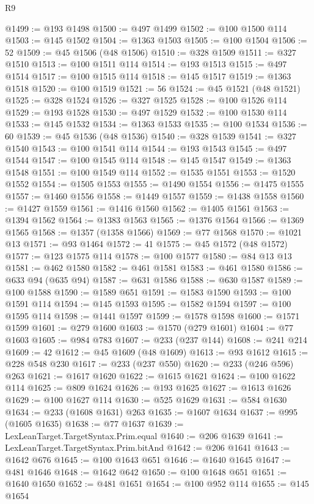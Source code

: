 \begin{lexlean}{R9}
\begin{coremodule}
{{{{{{{{{{{{{{{{{{{{{{{{{{{{{{{{{{{{{{{{{{{{{{{{{{{{{{{{{{{{{{{{{{{{{{{{{{{{{{{{{{{{{{{{{{{{{{{{{{{{{{{{{{{{@1499 := @193 @1498
@1500 := @497 @1499
@1502 := @100 @1500 @114
@1503 := @145 @1502
@1504 := @1363 @1503
@1505 := @100 @1504
@1506 := 52
@1509 := @45 @1506 (@48 @1506)
@1510 := @328 @1509
@1511 := @327 @1510
@1513 := @100 @1511 @114
@1514 := @193 @1513
@1515 := @497 @1514
@1517 := @100 @1515 @114
@1518 := @145 @1517
@1519 := @1363 @1518
@1520 := @100 @1519
@1521 := 56
@1524 := @45 @1521 (@48 @1521)
@1525 := @328 @1524
@1526 := @327 @1525
@1528 := @100 @1526 @114
@1529 := @193 @1528
@1530 := @497 @1529
@1532 := @100 @1530 @114
@1533 := @145 @1532
@1534 := @1363 @1533
@1535 := @100 @1534
@1536 := 60
@1539 := @45 @1536 (@48 @1536)
@1540 := @328 @1539
@1541 := @327 @1540
@1543 := @100 @1541 @114
@1544 := @193 @1543
@1545 := @497 @1544
@1547 := @100 @1545 @114
@1548 := @145 @1547
@1549 := @1363 @1548
@1551 := @100 @1549 @114
@1552 := @1535 @1551
@1553 := @1520 @1552
@1554 := @1505 @1553
@1555 := @1490 @1554
@1556 := @1475 @1555
@1557 := @1460 @1556
@1558 := @1449 @1557
@1559 := @1438 @1558
@1560 := @1427 @1559
@1561 := @1416 @1560
@1562 := @1405 @1561
@1563 := @1394 @1562
@1564 := @1383 @1563
@1565 := @1376 @1564
@1566 := @1369 @1565
@1568 := @1357 (@1358 @1566)
@1569 := @77 @1568
@1570 := @1021 @13
@1571 := @93 @1464
@1572 := 41
@1575 := @45 @1572 (@48 @1572)
@1577 := @123 @1575 @114
@1578 := @100 @1577
@1580 := @84 @13 @13
@1581 := @462 @1580
@1582 := @461 @1581
@1583 := @461 @1580
@1586 := @633 @94 (@635 @94)
@1587 := @631 @1586
@1588 := @630 @1587
@1589 := @100 @1588
@1590 := @1589 @651
@1591 := @1583 @1590
@1593 := @100 @1591 @114
@1594 := @145 @1593
@1595 := @1582 @1594
@1597 := @100 @1595 @114
@1598 := @1441 @1597
@1599 := @1578 @1598
@1600 := @1571 @1599
@1601 := @279 @1600
@1603 := @1570 (@279 @1601)
@1604 := @77 @1603
@1605 := @984 @783
@1607 := @233 (@237 @144)
@1608 := @241 @214
@1609 := 42
@1612 := @45 @1609 (@48 @1609)
@1613 := @93 @1612
@1615 := @228 @548 @230
@1617 := @233 (@237 @550)
@1620 := @233 (@246 @596) @263
@1621 := @1617 @1620
@1622 := @1615 @1621
@1624 := @100 @1622 @114
@1625 := @809 @1624
@1626 := @193 @1625
@1627 := @1613 @1626
@1629 := @100 @1627 @114
@1630 := @525 @1629
@1631 := @584 @1630
@1634 := @233 (@1608 @1631) @263
@1635 := @1607 @1634
@1637 := @995 (@1605 @1635)
@1638 := @77 @1637
@1639 := LexLeanTarget.TargetSyntax.Prim.equal
@1640 := @206 @1639
@1641 := LexLeanTarget.TargetSyntax.Prim.bitAnd
@1642 := @206 @1641
@1643 := @1642 @676
@1645 := @100 @1643 @651
@1646 := @1640 @1645
@1647 := @481 @1646
@1648 := @1642 @642
@1650 := @100 @1648 @651
@1651 := @1640 @1650
@1652 := @481 @1651
@1654 := @100 @952 @114
@1655 := @145 @1654
}}}}}}}}}}}}}}}}}}}}}}}}}}}}}}}}}}}}}}}}}}}}}}}}}}}}}}}}}}}}}}}}}}}}}}}}}}}}}}}}}}}}}}}}}}}}}}}}}}}}}}}}}}}}
\end{coremodule}
\end{lexlean}
